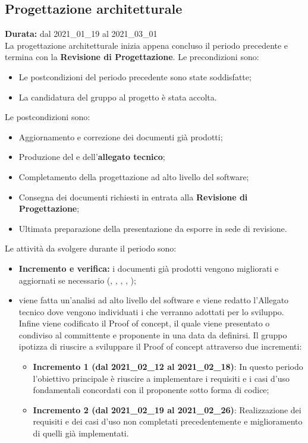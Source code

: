 \subsection{Progettazione architetturale}
\label{progettazione_architetturale}
\textbf{Durata:} dal 2021\_01\_19 al 2021\_03\_01\\
La progettazione architetturale inizia appena concluso il periodo precedente e termina con la \textbf{Revisione di Progettazione}.
Le precondizioni sono:
\begin{itemize}
    \item Le postcondizioni del periodo precedente sono state soddisfatte;
    \item La candidatura del gruppo al progetto {\NomeProgetto} è stata accolta.
\end{itemize}
Le postcondizioni sono:
\begin{itemize}
    \item Aggiornamento e correzione dei documenti già prodotti;
    \item Produzione del  e dell'\textbf{allegato tecnico};
    \item Completamento della progettazione ad alto livello del software;
    \item Consegna dei documenti richiesti in entrata alla \textbf{Revisione di Progettazione};
    \item Ultimata preparazione della presentazione da esporre in sede di revisione.
\end{itemize}
Le attività da svolgere durante il periodo sono:
\begin{itemize}
    \item \textbf{Incremento e verifica:} i documenti già prodotti vengono migliorati e aggiornati se necessario ({\NdP}, {\PdP}, {\Glossario}, {\PdQ}, {\AdR});
    \item {} viene fatta un'analisi ad alto livello del software e viene redatto l'Allegato tecnico dove vengono individuati i  che verranno adottati per lo sviluppo. Infine viene codificato il Proof of concept, il quale viene presentato o condiviso al committente e proponente in una data da definirsi. Il gruppo ipotizza di riuscire a sviluppare il Proof of concept attraverso due incrementi:
    \begin{itemize}
    	\item \textbf{Incremento 1 (dal 2021\_02\_12 al 2021\_02\_18)}: In questo periodo l'obiettivo principale è riuscire a implementare i requisiti e i casi d'uso fondamentali concordati con il proponente sotto forma di codice;
        \item \textbf{Incremento 2 (dal 2021\_02\_19 al 2021\_02\_26)}: Realizzazione dei requisiti e dei casi d'uso non completati precedentemente e miglioramento di quelli già implementati.
    \end{itemize}
\end{itemize}
\newpage
